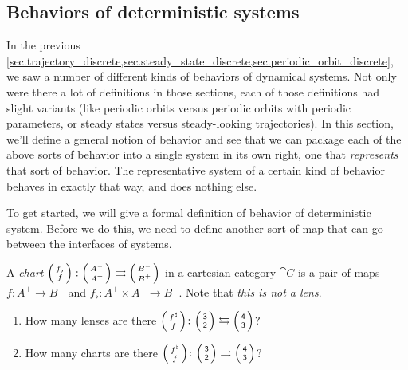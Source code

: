 \documentclass[DynamicalBook]{subfiles}
\begin{document}
\subsection{Behaviors of deterministic systems}\label{sec.behaviors}

In the previous
\cref{sec.trajectory_discrete,sec.steady_state_discrete,sec.periodic_orbit_discrete},
we saw a number of different kinds of behaviors of dynamical systems. Not only
were there a lot of definitions in those sections, each of those definitions had
slight variants (like periodic orbits versus periodic orbits with periodic
parameters, or steady states versus steady-looking trajectories). In this
section, we'll define a general notion of behavior and see that we can package each of the above sorts of behavior into a single system in its own right, one that \emph{represents} that sort of
behavior. The representative system of a certain kind of behavior behaves in
exactly that way, and does nothing else.

To get started, we will give a formal definition of behavior of deterministic
system. Before we do this, we need to define another sort of map that can go
between the interfaces of systems.
\begin{definition}\label{def.chart_discrete}
  A \emph{chart} $\lens{f_{\flat}}{f} : \lens{A^-}{A^+} \rightrightarrows
  \lens{B^-}{B^+}$ in a cartesian category $\cat{C}$ is a pair of maps $f : A^+ \to B^+$ and $f_{\flat} : A^+
  \times A^- \to B^-$. Note that \emph{this is not a lens}.
\end{definition}

\begin{exercise}
\begin{enumerate}
	\item How many lenses are there $\lens{f^\sharp}{f}\colon\lens{\3}{\2}\fromto\lens{\4}{\3}$?
	\item How many charts are there $\lens{f^\flat}{f}\colon\lens{\3}{\2}\tto\lens{\4}{\3}$?
\qedhere
\end{enumerate}
\end{exercise}
\end{document}
